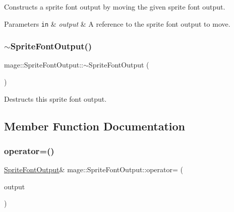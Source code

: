 Constructs a sprite font output by moving the given sprite font output.


\begin{DoxyParams}[1]{Parameters}
\mbox{\tt in}  & {\em output} & A reference to the sprite font output to move. \\
\hline
\end{DoxyParams}
\hypertarget{structmage_1_1_sprite_font_output_ab0793582b679667ff018eda962b77f6a}{}\label{structmage_1_1_sprite_font_output_ab0793582b679667ff018eda962b77f6a} 
\subsubsection{\texorpdfstring{$\sim$\+Sprite\+Font\+Output()}{~SpriteFontOutput()}}
{\footnotesize\ttfamily mage\+::\+Sprite\+Font\+Output\+::$\sim$\+Sprite\+Font\+Output (\begin{DoxyParamCaption}{ }\end{DoxyParamCaption})\hspace{0.3cm}{\ttfamily [default]}}

Destructs this sprite font output. 

\subsection{Member Function Documentation}
\hypertarget{structmage_1_1_sprite_font_output_a1eeb719ec5e2e8f84f51fc9c5db228f7}{}\label{structmage_1_1_sprite_font_output_a1eeb719ec5e2e8f84f51fc9c5db228f7} 
\subsubsection{\texorpdfstring{operator=()}{operator=()}\hspace{0.1cm}{\footnotesize\ttfamily [1/2]}}
{\footnotesize\ttfamily \hyperlink{structmage_1_1_sprite_font_output}{Sprite\+Font\+Output}\& mage\+::\+Sprite\+Font\+Output\+::operator= (\begin{DoxyParamCaption}\item[{const \hyperlink{structmage_1_1_sprite_font_output}{Sprite\+Font\+Output} \&}]{output }\end{DoxyParamCaption})\hspace{0.3cm}{\ttfamily [delete]}}

